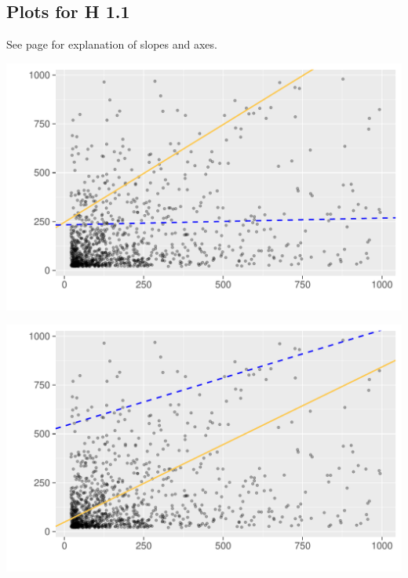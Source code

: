 \subsection{Plots for H 1.1}
\label{sec:h_1.1_plots}

See page \pageref{sec:lm_plots_description} for explanation of slopes and axes.

\vspace{20 pt}

\begin{minipage}{.5\textwidth}
	\centering
	\includegraphics[page=1,scale=0.3]{../hypotheses/lm_in_ext_model_1_2.pdf}
  \label{fig:hyp1_model_1-2}
\end{minipage}
\begin{minipage}{.5\textwidth}
	\centering
	\includegraphics[page=1,scale=0.3]{../hypotheses/lm_in_ext_model_3_4.pdf}
  \label{fig:hyp1_model_3-4}
\end{minipage}


